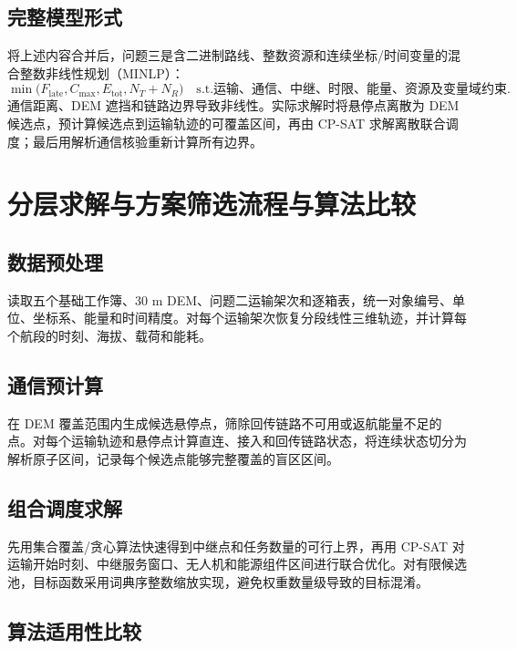 \documentclass[UTF8,a4paper,12pt]{ctexart}
\begin{document}
\subsection{完整模型形式}

将上述内容合并后，问题三是含二进制路线、整数资源和连续坐标/时间变量的混合整数非线性规划（MINLP）：
\begin{equation}
 \min\big(F_{\mathrm{late}},C_{\max},E_{\mathrm{tot}},N_T+N_R\big)
\quad\text{s.t.运输、通信、中继、时限、能量、资源及变量域约束}.
\end{equation}
通信距离、DEM 遮挡和链路边界导致非线性。实际求解时将悬停点离散为 DEM 候选点，预计算候选点到运输轨迹的可覆盖区间，再由 CP-SAT 求解离散联合调度；最后用解析通信核验重新计算所有边界。

\section{分层求解与方案筛选流程与算法比较}

\subsection{数据预处理}
读取五个基础工作簿、30 m DEM、问题二运输架次和逐箱表，统一对象编号、单位、坐标系、能量和时间精度。对每个运输架次恢复分段线性三维轨迹，并计算每个航段的时刻、海拔、载荷和能耗。

\subsection{通信预计算}
在 DEM 覆盖范围内生成候选悬停点，筛除回传链路不可用或返航能量不足的点。对每个运输轨迹和悬停点计算直连、接入和回传链路状态，将连续状态切分为解析原子区间，记录每个候选点能够完整覆盖的盲区区间。

\subsection{组合调度求解}
先用集合覆盖/贪心算法快速得到中继点和任务数量的可行上界，再用 CP-SAT 对运输开始时刻、中继服务窗口、无人机和能源组件区间进行联合优化。对有限候选池，目标函数采用词典序整数缩放实现，避免权重数量级导致的目标混淆。

\subsection{算法适用性比较}
\end{document}
